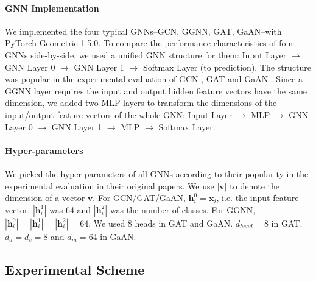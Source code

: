 \paragraph{GNN Implementation}
We implemented the four typical GNNs--GCN, GGNN, GAT, GaAN--with PyTorch Geometric 1.5.0.
To compare the performance characteristics of four GNNs side-by-side, we used a unified GNN structure for them: Input Layer $\rightarrow$ GNN Layer 0 $\rightarrow$ GNN Layer 1 $\rightarrow$ Softmax Layer (to prediction).
The structure was popular in the experimental evaluation of GCN \cite{kipf2017_gcn}, GAT \cite{huang2018_gat} and GaAN \cite{zhang2018_gaan}.
Since a GGNN layer requires the input and output hidden feature vectors have the same dimension, we added two MLP layers to transform the dimensions of the input/output feature vectors of the whole GNN: Input Layer $\rightarrow$ MLP $\rightarrow$ GNN Layer 0 $\rightarrow$ GNN Layer 1 $\rightarrow$ MLP $\rightarrow$ Softmax Layer.

\paragraph{Hyper-parameters}
We picked the hyper-parameters of all GNNs according to their popularity in the experimental evaluation in their original papers.
We use $|\boldsymbol{v}|$ to denote the dimension of a vector $\boldsymbol{v}$.
For GCN/GAT/GaAN, $\boldsymbol{h}^0_i = \boldsymbol{x}_i$, i.e. the input feature vector.
$|\boldsymbol{h}^1_i|$ was 64 and $|\boldsymbol{h}^2_i|$ was the number of classes.
For GGNN, $|\boldsymbol{h}^0_i| = |\boldsymbol{h}^1_i| = |\boldsymbol{h}^2_i| = 64$.
We used 8 heads in GAT and GaAN.
$d_{head}=8$ in GAT.
$d_a=d_v=8$ and $d_m=64$ in GaAN.

\subsection{Experimental Scheme}
\label{sec:experimental_scheme}
